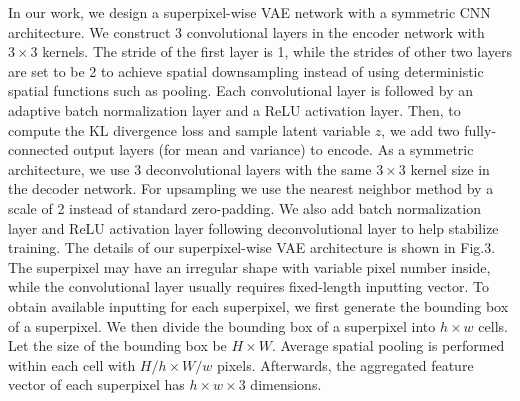 \documentclass[sigconf]{acmart}
\begin{document}
In our work, we design a superpixel-wise VAE network with a symmetric CNN architecture. We construct 3 convolutional layers in the encoder network with $3\times 3$ kernels. The stride of the first layer is 1, while the strides of other two layers are set to be 2 to achieve spatial downsampling instead of using deterministic spatial functions such as pooling. Each convolutional layer is followed by an adaptive batch normalization layer and a ReLU activation layer. Then, to compute the KL divergence loss and sample latent variable $z$, we add two fully-connected output layers (for mean and variance) to encode. As a symmetric architecture, we use 3 deconvolutional layers with the same $3\times 3$ kernel size in the decoder network. For upsampling we use the nearest neighbor method by a scale of 2 instead of standard zero-padding. We also add batch normalization layer and ReLU activation layer following deconvolutional layer to help stabilize training.  The details of our superpixel-wise VAE architecture is shown in Fig.3.
The superpixel may have an irregular shape with variable pixel number inside, while the convolutional layer usually requires fixed-length inputting vector. To obtain available inputting for each superpixel, we first generate the bounding box of a superpixel. We then divide the bounding box of a superpixel into $h\times w$ cells. Let the size of the bounding box be $H\times W$. Average spatial pooling \cite{DBLP:journals/pami/HeZR015} is performed within each cell with $H/h\times W/w$ pixels. Afterwards, the aggregated feature vector of each superpixel has $h\times w\times 3$ dimensions.
\end{document}
